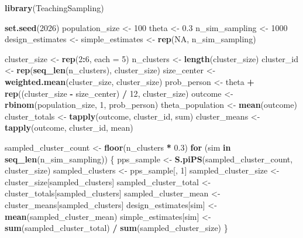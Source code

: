 \documentclass[
  english,
  12pt,
]{book}
\newenvironment{Shaded}{\begin{snugshade}}{\end{snugshade}}
\newcommand{\AttributeTok}[1]{\textcolor[rgb]{0.13,0.29,0.53}{#1}}
\newcommand{\ConstantTok}[1]{\textcolor[rgb]{0.56,0.35,0.01}{#1}}
\newcommand{\ControlFlowTok}[1]{\textcolor[rgb]{0.13,0.29,0.53}{\textbf{#1}}}
\newcommand{\DecValTok}[1]{\textcolor[rgb]{0.00,0.00,0.81}{#1}}
\newcommand{\FloatTok}[1]{\textcolor[rgb]{0.00,0.00,0.81}{#1}}
\newcommand{\FunctionTok}[1]{\textcolor[rgb]{0.13,0.29,0.53}{\textbf{#1}}}
\newcommand{\NormalTok}[1]{#1}
\newcommand{\OtherTok}[1]{\textcolor[rgb]{0.56,0.35,0.01}{#1}}
\newcommand{\SpecialCharTok}[1]{\textcolor[rgb]{0.81,0.36,0.00}{\textbf{#1}}}
\begin{document}
\begin{Shaded}
\begin{Highlighting}[]
\FunctionTok{library}\NormalTok{(TeachingSampling)}

\FunctionTok{set.seed}\NormalTok{(}\DecValTok{2026}\NormalTok{)}
\NormalTok{population\_size }\OtherTok{\textless{}{-}} \DecValTok{100}
\NormalTok{theta }\OtherTok{\textless{}{-}} \FloatTok{0.3}
\NormalTok{n\_sim\_sampling }\OtherTok{\textless{}{-}} \DecValTok{1000}
\NormalTok{design\_estimates }\OtherTok{\textless{}{-}}\NormalTok{ simple\_estimates }\OtherTok{\textless{}{-}} \FunctionTok{rep}\NormalTok{(}\ConstantTok{NA}\NormalTok{, n\_sim\_sampling)}

\NormalTok{cluster\_size }\OtherTok{\textless{}{-}} \FunctionTok{rep}\NormalTok{(}\DecValTok{2}\SpecialCharTok{:}\DecValTok{6}\NormalTok{, }\AttributeTok{each =} \DecValTok{5}\NormalTok{)}
\NormalTok{n\_clusters }\OtherTok{\textless{}{-}} \FunctionTok{length}\NormalTok{(cluster\_size)}
\NormalTok{cluster\_id }\OtherTok{\textless{}{-}} \FunctionTok{rep}\NormalTok{(}\FunctionTok{seq\_len}\NormalTok{(n\_clusters), cluster\_size)}
\NormalTok{size\_center }\OtherTok{\textless{}{-}} \FunctionTok{weighted.mean}\NormalTok{(cluster\_size, cluster\_size)}
\NormalTok{prob\_person }\OtherTok{\textless{}{-}}\NormalTok{ theta }\SpecialCharTok{+} \FunctionTok{rep}\NormalTok{((cluster\_size }\SpecialCharTok{{-}}\NormalTok{ size\_center) }\SpecialCharTok{/} \DecValTok{12}\NormalTok{, cluster\_size)}
\NormalTok{outcome }\OtherTok{\textless{}{-}} \FunctionTok{rbinom}\NormalTok{(population\_size, }\DecValTok{1}\NormalTok{, prob\_person)}
\NormalTok{theta\_population }\OtherTok{\textless{}{-}} \FunctionTok{mean}\NormalTok{(outcome)}
\NormalTok{cluster\_totals }\OtherTok{\textless{}{-}} \FunctionTok{tapply}\NormalTok{(outcome, cluster\_id, sum)}
\NormalTok{cluster\_means }\OtherTok{\textless{}{-}} \FunctionTok{tapply}\NormalTok{(outcome, cluster\_id, mean)}

\NormalTok{sampled\_cluster\_count }\OtherTok{\textless{}{-}} \FunctionTok{floor}\NormalTok{(n\_clusters }\SpecialCharTok{*} \FloatTok{0.3}\NormalTok{)}
\ControlFlowTok{for}\NormalTok{ (sim }\ControlFlowTok{in} \FunctionTok{seq\_len}\NormalTok{(n\_sim\_sampling)) \{}
\NormalTok{  pps\_sample }\OtherTok{\textless{}{-}} \FunctionTok{S.piPS}\NormalTok{(sampled\_cluster\_count, cluster\_size)}
\NormalTok{  sampled\_clusters }\OtherTok{\textless{}{-}}\NormalTok{ pps\_sample[, }\DecValTok{1}\NormalTok{]}
\NormalTok{  sampled\_cluster\_size }\OtherTok{\textless{}{-}}\NormalTok{ cluster\_size[sampled\_clusters]}
\NormalTok{  sampled\_cluster\_total }\OtherTok{\textless{}{-}}\NormalTok{ cluster\_totals[sampled\_clusters]}
\NormalTok{  sampled\_cluster\_mean }\OtherTok{\textless{}{-}}\NormalTok{ cluster\_means[sampled\_clusters]}
\NormalTok{  design\_estimates[sim] }\OtherTok{\textless{}{-}} \FunctionTok{mean}\NormalTok{(sampled\_cluster\_mean)}
\NormalTok{  simple\_estimates[sim] }\OtherTok{\textless{}{-}}
    \FunctionTok{sum}\NormalTok{(sampled\_cluster\_total) }\SpecialCharTok{/} \FunctionTok{sum}\NormalTok{(sampled\_cluster\_size)}
\NormalTok{\}}


\end{Highlighting}
\end{Shaded}
\end{document}
